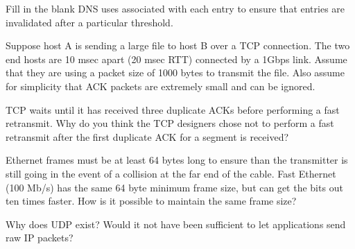 \documentclass[answers,addpoints]{exam}
\begin{document}
\begin{questions}
\question
Fill in the blank
DNS uses \underline{\hspace{3cm}} associated with each entry to ensure that entries are invalidated after a particular threshold.

\question
Suppose host A is sending a large file to host B over a TCP connection. The two end hosts are 10 msec apart (20 msec RTT) connected by a 1Gbps link. Assume that they are using a packet size of 1000 bytes to transmit the file. Also assume for simplicity that ACK packets are extremely small and can be ignored. 



\question
TCP waits until it has received three duplicate ACKs before performing a fast retransmit. Why do you think the TCP designers chose not to perform a fast retransmit after the first duplicate ACK for a segment is received?
\fillwithdottedlines{1in}


\question
Ethernet frames must be at least 64 bytes long to ensure than the transmitter is still going in the event of a collision at the far end of the cable. Fast Ethernet (100 Mb/s) has the same 64 byte minimum frame size, but can get the bits out ten times faster. How is it possible to maintain the same frame size?
\fillwithdottedlines{1in}



\question
Why does UDP exist? Would it not have been sufficient to let applications send raw IP packets?
\fillwithdottedlines{1in}


\question
{}



\end{questions}
\end{document}
